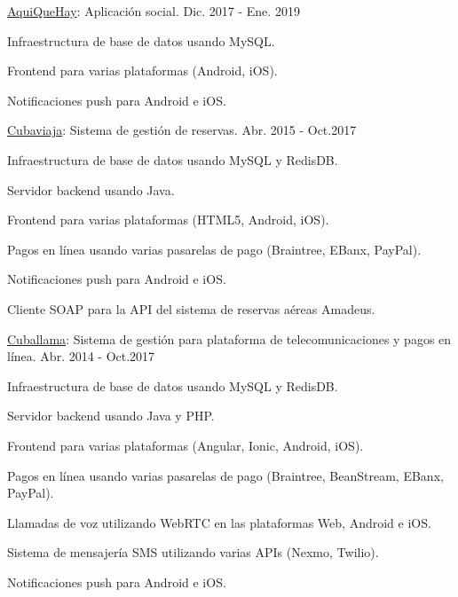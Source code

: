 \begin{cventries}
  \cventry
    {\href{https://aquiquehay.com.ec/}{AquiQueHay}: Aplicación social.} %
    {} %
    {} %
    {Dic. 2017 - Ene. 2019} %
    {
      \begin{cvitems} %
        \item {Infraestructura de base de datos usando MySQL.}
        \item {Frontend para varias plataformas (Android, iOS).}
        \item {Notificaciones push para Android e iOS.}
      \end{cvitems}
    }

  \cventry
    {\href{https://www.cuballama.com/viajes/vuelos}{Cubaviaja}: Sistema de gestión de reservas.} %
    {} %
    {} %
    {Abr. 2015 - Oct.2017} %
    {
      \begin{cvitems} %
        \item {Infraestructura de base de datos usando MySQL y RedisDB.}
        \item {Servidor backend usando Java.}
        \item {Frontend para varias plataformas (HTML5, Android, iOS).}
        \item {Pagos en línea usando varias pasarelas de pago (Braintree, EBanx, PayPal).}
        \item {Notificaciones push para Android e iOS.}
        \item {Cliente SOAP para la API del sistema de reservas aéreas Amadeus.}
      \end{cvitems}
    }

  \cventry
    {\href{https://www.cuballama.com/}{Cuballama}: Sistema de gestión para plataforma de telecomunicaciones y pagos en línea.} %
    {} %
    {} %
    {Abr. 2014 - Oct.2017} %
    {
      \begin{cvitems} %
        \item {Infraestructura de base de datos usando MySQL y RedisDB.}
        \item {Servidor backend usando Java y PHP.}
        \item {Frontend para varias plataformas (Angular, Ionic, Android, iOS).}
        \item {Pagos en línea usando varias pasarelas de pago (Braintree, BeanStream, EBanx, PayPal).}
        \item {Llamadas de voz utilizando WebRTC en las plataformas Web, Android e iOS.}
        \item {Sistema de mensajería SMS utilizando varias APIs (Nexmo, Twilio).}
        \item {Notificaciones push para Android e iOS.}
      \end{cvitems}
    }

\end{cventries}
